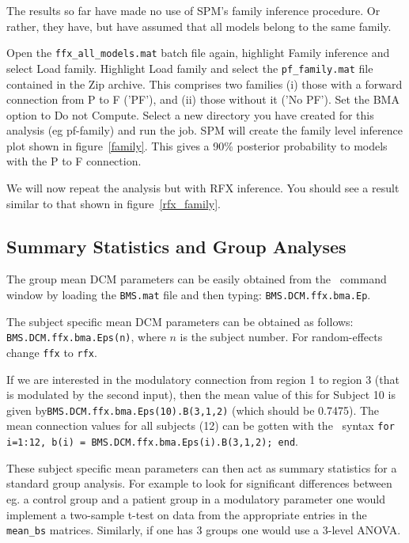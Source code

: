 The results so far have made no use of SPM's family inference procedure. 
Or rather, they have, but have assumed that all models belong to the same family. 

Open the \verb!ffx_all_models.mat! batch file again, highlight Family inference and select Load family. Highlight Load family and select the \verb!pf_family.mat! file contained in the Zip archive. This comprises two families (i) those with a forward connection from P to F ('PF'), and (ii) those without it ('No PF'). Set the BMA option to Do not Compute. Select a new directory you have created for this analysis (eg pf-family) and run the job.
SPM will create the family level inference plot shown in figure~\ref{family}.
This gives a 90\% posterior probability to models with the P to F connection.

We will now repeat the analysis but with RFX inference. You should see a result similar to that shown in
figure~\ref{rfx_family}.

\subsection{Summary Statistics and Group Analyses}

The group mean DCM parameters can be easily obtained from the \matlab\ command window by loading the \verb!BMS.mat! file and then typing: \verb!BMS.DCM.ffx.bma.Ep!.

The subject specific mean DCM parameters can be obtained as follows: \verb!BMS.DCM.ffx.bma.Eps(n)!, where $n$ is the subject number. For random-effects change \verb!ffx! to \verb!rfx!. 

If we are interested in the modulatory connection from region 1 to region 3 (that is modulated by the second input), then the mean value of this for Subject 10 is given by\newline \verb!BMS.DCM.ffx.bma.Eps(10).B(3,1,2)! (which should be 0.7475). The mean connection values for all subjects (12) can be gotten with the \matlab\ syntax \newline \verb!for i=1:12, b(i) = BMS.DCM.ffx.bma.Eps(i).B(3,1,2); end!.

These subject specific mean parameters can then act as summary statistics for a standard group analysis. For example to look for significant differences between eg. a control group and a patient group in a modulatory parameter one would implement a two-sample t-test on data from the appropriate entries in the \verb!mean_bs! matrices. Similarly, if one has 3 groups one would use a 3-level ANOVA.


